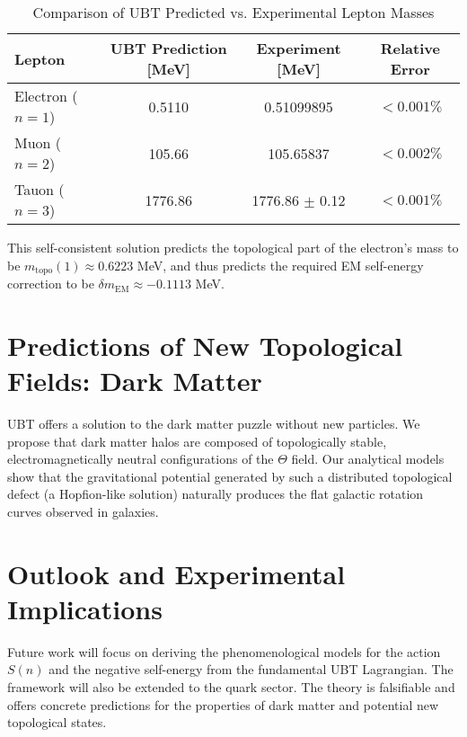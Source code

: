 \documentclass[12pt, a4paper]{article}
\begin{document}
\begin{table}[h!]
\centering
\caption{Comparison of UBT Predicted vs. Experimental Lepton Masses}
\label{tab:masses}
\begin{tabular}{l|c|c|c}
\hline
\textbf{Lepton} & \textbf{UBT Prediction [MeV]} & \textbf{Experiment [MeV]} & \textbf{Relative Error} \\
\hline
Electron (\(n=1\)) & 0.5110 & 0.51099895 & \(< 0.001\%\) \\
Muon (\(n=2\)) & 105.66 & 105.65837 & \(< 0.002\%\) \\
Tauon (\(n=3\)) & 1776.86 & 1776.86 \(\pm\) 0.12 & \(< 0.001\%\) \\
\hline
\end{tabular}
\end{table}
This self-consistent solution predicts the topological part of the electron's mass to be \(m_{\text{topo}}(1) \approx 0.6223\) MeV, and thus predicts the required EM self-energy correction to be \( \delta m_{\text{EM}} \approx -0.1113 \) MeV.

\section{Predictions of New Topological Fields: Dark Matter}
UBT offers a solution to the dark matter puzzle without new particles. We propose that dark matter halos are composed of topologically stable, electromagnetically neutral configurations of the \( \Theta \) field. Our analytical models show that the gravitational potential generated by such a distributed topological defect (a Hopfion-like solution) naturally produces the flat galactic rotation curves observed in galaxies.

\section{Outlook and Experimental Implications}
Future work will focus on deriving the phenomenological models for the action \(S(n)\) and the negative self-energy from the fundamental UBT Lagrangian. The framework will also be extended to the quark sector. The theory is falsifiable and offers concrete predictions for the properties of dark matter and potential new topological states.

\appendix
\end{document}

